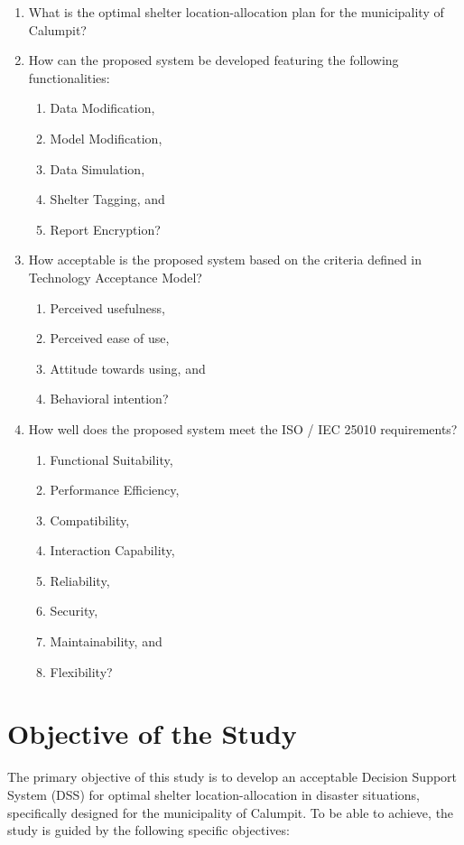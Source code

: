 	\begin{enumerate}
		\item What is the optimal shelter location-allocation plan for the municipality of Calumpit?
		\item How can the proposed system be developed featuring the following functionalities:
		\begin{enumerate}
			\item Data Modification,
			\item Model Modification,
			\item Data Simulation,
			\item Shelter Tagging, and
			\item Report Encryption?
		\end{enumerate}
		\item How acceptable is the proposed system based on the criteria defined in Technology Acceptance Model?
		\begin{enumerate}
			\item Perceived usefulness,
			\item Perceived ease of use,
			\item Attitude towards using, and
			\item Behavioral intention?
		\end{enumerate}
		\item How well does the proposed system meet the ISO / IEC 25010 requirements?
		\begin{enumerate}
			\item Functional Suitability,
			\item Performance Efficiency,
			\item Compatibility,
			\item Interaction Capability,
			\item Reliability,
			\item Security,
			\item Maintainability, and
			\item Flexibility?
		\end{enumerate}
	\end{enumerate}
	
\section{Objective of the Study}
	The primary objective of this study is to develop an acceptable Decision Support System (DSS) for optimal shelter location-allocation in disaster situations, specifically designed for the municipality of Calumpit. To be able to achieve, the study is guided by the following specific objectives:
	
